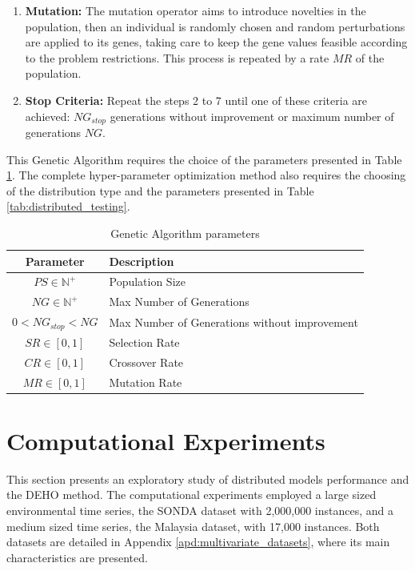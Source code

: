 \begin{enumerate}
    \item \textbf{Mutation:} The mutation operator aims to introduce novelties in the population, then an individual is randomly chosen and random perturbations are applied to its genes, taking care to keep the gene values feasible according to the problem restrictions. This process is repeated by a rate $MR$ of the population.

    \item \textbf{Stop Criteria:} Repeat the steps 2 to 7 until one of these criteria are achieved: $NG_{stop}$ generations without improvement or maximum number of generations $NG$.
\end{enumerate}

This Genetic Algorithm requires the choice of the  parameters presented in Table \ref{tab:genetic_algoritm}. The complete hyper-parameter optimization method also requires the choosing of the distribution type and the parameters presented in Table \ref{tab:distributed_testing}.

\begin{table}[htb]
    \centering
    \begin{tabular}{|c|p{7cm}|} \hline
        \textbf{Parameter} & \textbf{Description}  \\ \hline
         $PS \in \mathbb{N}^+$ & Population Size \\ \hline
         $NG \in \mathbb{N}^+$ & Max Number of Generations \\ \hline 
         $0 < NG_{stop} < NG$ & Max Number of Generations without improvement \\ \hline 
         $SR \in [0,1]$ & Selection Rate \\ \hline 
         $CR \in [0,1]$ & Crossover Rate \\ \hline 
         $MR \in [0,1]$ & Mutation Rate \\ \hline 
    \end{tabular}
    \caption{Genetic Algorithm parameters}
    \label{tab:genetic_algoritm}
\end{table}


\section{Computational Experiments}
\label{sec:scalability_experiments}

This section presents an exploratory study of distributed models performance and the DEHO method. The computational experiments employed a large sized environmental time series, the SONDA dataset with 2,000,000 instances, and a medium sized time series, the Malaysia dataset, with 17,000 instances. Both datasets are detailed in Appendix \ref{apd:multivariate_datasets}, where its main characteristics are presented.

